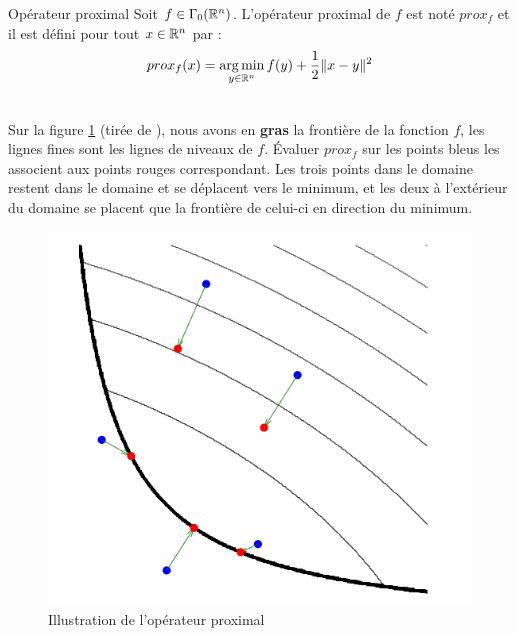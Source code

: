 \documentclass[a4paper,12pt]{article}
\begin{document}
\begin{definition}{Opérateur proximal}
Soit $f\in\Gamma_0(\mathbb{R}^n)$. L'opérateur proximal de $f$ est noté $prox_f$ et il est défini pour tout $x\in\mathbb{R}^n$ par : 
$$
prox_f(x) = \operatorname*{arg\,min}_{y\in\mathbb{R}^n} f(y) +\frac{1}{2}\|x-y\|^2
$$
\end{definition}
\\
Sur la figure \ref{fig:proximal} (tirée de \cite{parikh2014proximal}), nous avons en \textbf{gras} la frontière de la fonction $f$, les lignes fines sont les lignes de niveaux de $f$. Évaluer $prox_f$ sur les points bleus les associent aux points rouges correspondant. Les trois points dans le domaine restent dans le domaine et se déplacent vers le minimum, et les deux à l'extérieur du domaine se placent que la frontière de celui-ci en direction du minimum. 
\begin{figure}[!h]
\centering
\includegraphics[scale=0.7]{img/proximal.png}
\caption{\label{fig:proximal}Illustration de l'opérateur proximal}
\end{figure}
\end{document}
